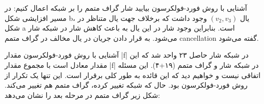 \begin{itemframe}{آشنایی با روش فورد-فولکرسون}
\itm
بیایید شار گراف متمم را بر شبکه اعمال کنیم:
\itm
در مسیر افزایشی شکل b، یال
$(v_2, v_3)$
وجود داشت که برخلاف جهت یال متناظر در شکل a است. بنابراین وجود شار در این یال به باعث کاهش شار در شبکه شار می‌شود. به قرار دادن جریان در یال مخالف در گراف متمم cancellation گفته می‌شود.
\end{itemframe}

\begin{itemframe}{آشنایی با روش فورد-فولکرسون}
\itm
مقدار |f| در شبکه شار حاصل ۲۳ واحد شد که این مقدار معادل است با مجموع مقدار |f| در شبکه شار و گراف متمم (۱۹‌+۴). این مسئله اتفاقی نیست و خواهیم دید که این قائده به طور کلی برقرار است.
\itm
این تنها یک تکرار از روش فورد-فولکرسون بود. حال که شبکه تغییر کرده، گراف متمم هم تغییر می‌کند. شکل زیر گراف متمم در مرحله بعد را نشان می‌دهد:
\end{itemframe}
